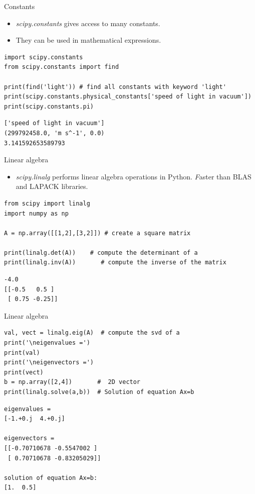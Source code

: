 \documentclass{beamer}
\begin{document}
\begin{frame}[fragile]{Constants}
\begin{itemize}
    \item \emph{scipy.constants} gives access to many constants. 
    \item They can be used in mathematical expressions. 
\end{itemize}

\begin{lstlisting}
import scipy.constants
from scipy.constants import find

print(find('light')) # find all constants with keyword 'light'
print(scipy.constants.physical_constants['speed of light in vacuum'])
print(scipy.constants.pi) 
\end{lstlisting}
\begin{verbatim}
['speed of light in vacuum']
(299792458.0, 'm s^-1', 0.0)
3.141592653589793
\end{verbatim}

\end{frame}


\begin{frame}[fragile]{Linear algebra}
\begin{itemize}
    \item \emph{scipy.linalg} performs linear algebra operations in Python. 
    \emph Faster than BLAS and LAPACK libraries. 
\end{itemize}

\begin{lstlisting}
from scipy import linalg
import numpy as np

A = np.array([[1,2],[3,2]]) # create a square matrix

print(linalg.det(A))    # compute the determinant of a
print(linalg.inv(A))       # compute the inverse of the matrix
\end{lstlisting}

\begin{verbatim}
-4.0
[[-0.5   0.5 ]
 [ 0.75 -0.25]]
\end{verbatim}
\end{frame}


\begin{frame}[fragile]{Linear algebra}
\begin{lstlisting}
val, vect = linalg.eig(A)  # compute the svd of a
print('\neigenvalues =')
print(val)
print('\neigenvectors =')
print(vect)
b = np.array([2,4])       #  2D vector
print(linalg.solve(a,b))  # Solution of equation Ax=b
\end{lstlisting}

\begin{verbatim}
eigenvalues =
[-1.+0.j  4.+0.j]

eigenvectors =
[[-0.70710678 -0.5547002 ]
 [ 0.70710678 -0.83205029]]

solution of equation Ax=b:  
[1.  0.5]
\end{verbatim}
\end{frame}
\end{document}
